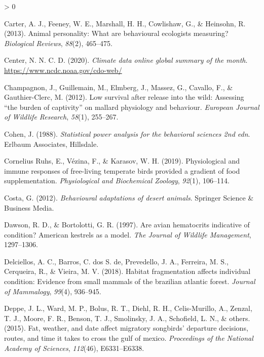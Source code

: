 \documentclass[
]{article}
\newlength{\cslhangindent}
\newenvironment{CSLReferences}[2] %
 {%
  \setlength{\parindent}{0pt}
  \ifodd #1 \everypar{\setlength{\hangindent}{\cslhangindent}}\ignorespaces\fi
  \ifnum #2 > 0
  \setlength{\parskip}{#2\baselineskip}
  \fi
 }%
 {}
\begin{document}
\begin{CSLReferences}{1}{0}
\leavevmode\hypertarget{ref-carter2013animal}{}%
Carter, A. J., Feeney, W. E., Marshall, H. H., Cowlishaw, G., \&
Heinsohn, R. (2013). Animal personality: What are behavioural ecologists
measuring? \emph{Biological Reviews}, \emph{88}(2), 465--475.

\leavevmode\hypertarget{ref-noaa2020climate}{}%
Center, N. N. C. D. (2020). \emph{Climate data online global summary of
the month}. \url{https://www.ncdc.noaa.gov/cdo-web/}

\leavevmode\hypertarget{ref-champagnon2012low}{}%
Champagnon, J., Guillemain, M., Elmberg, J., Massez, G., Cavallo, F., \&
Gauthier-Clerc, M. (2012). Low survival after release into the wild:
Assessing {``the burden of captivity''} on mallard physiology and
behaviour. \emph{European Journal of Wildlife Research}, \emph{58}(1),
255--267.

\leavevmode\hypertarget{ref-cohen1988statistical}{}%
Cohen, J. (1988). \emph{Statistical power analysis for the behavioral
sciences 2nd edn}. Erlbaum Associates, Hillsdale.

\leavevmode\hypertarget{ref-cornelius2019physiological}{}%
Cornelius Ruhs, E., Vézina, F., \& Karasov, W. H. (2019). Physiological
and immune responses of free-living temperate birds provided a gradient
of food supplementation. \emph{Physiological and Biochemical Zoology},
\emph{92}(1), 106--114.

\leavevmode\hypertarget{ref-costa2012behavioural}{}%
Costa, G. (2012). \emph{Behavioural adaptations of desert animals}.
Springer Science \& Business Media.

\leavevmode\hypertarget{ref-dawson1997avian}{}%
Dawson, R. D., \& Bortolotti, G. R. (1997). Are avian hematocrits
indicative of condition? American kestrels as a model. \emph{The Journal
of Wildlife Management}, 1297--1306.

\leavevmode\hypertarget{ref-delciellos2018habitat}{}%
Delciellos, A. C., Barros, C. dos S. de, Prevedello, J. A., Ferreira, M.
S., Cerqueira, R., \& Vieira, M. V. (2018). Habitat fragmentation
affects individual condition: Evidence from small mammals of the
brazilian atlantic forest. \emph{Journal of Mammalogy}, \emph{99}(4),
936--945.

\leavevmode\hypertarget{ref-deppe2015fat}{}%
Deppe, J. L., Ward, M. P., Bolus, R. T., Diehl, R. H., Celis-Murillo,
A., Zenzal, T. J., Moore, F. R., Benson, T. J., Smolinsky, J. A.,
Schofield, L. N., \& others. (2015). Fat, weather, and date affect
migratory songbirds' departure decisions, routes, and time it takes to
cross the gulf of mexico. \emph{Proceedings of the National Academy of
Sciences}, \emph{112}(46), E6331--E6338.


\end{CSLReferences}
\end{document}
